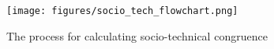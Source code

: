 



\begin{figure}
    \centering
    \texttt{[image: figures/socio\_tech\_flowchart.png]}
    \caption{The process for calculating socio-technical congruence}
    \label{fig:socio-tech-flowchart}
\end{figure}

